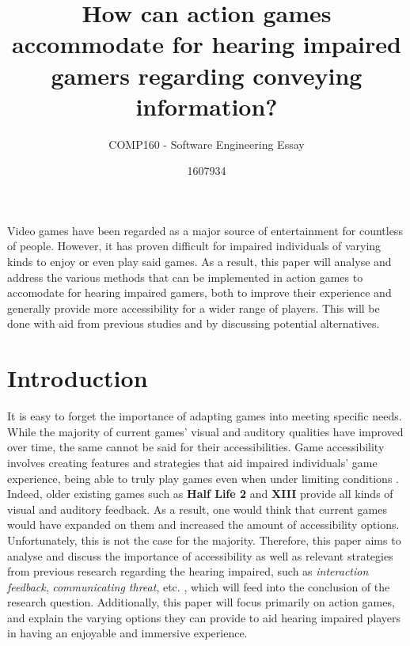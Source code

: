 \documentclass{scrartcl}
\title{How can action games accommodate for hearing impaired gamers regarding conveying information?}
\subtitle{COMP160 - Software Engineering Essay}
\author{1607934}
\begin{document}
\maketitle

\abstract
Video games have been regarded as a major source of entertainment for countless of people. However, it has proven difficult for impaired individuals of varying kinds to enjoy or even play said games. As a result, this paper will analyse and address the various methods that can be implemented in action games to accomodate for hearing impaired gamers, both to improve their experience and generally provide more accessibility for a wider range of players. This will be done with aid from previous studies and by discussing potential alternatives.

\section{Introduction}
It is easy to forget the importance of adapting games into meeting specific needs. While the majority of current games' visual and auditory qualities have improved over time, the same cannot be said for their accessibilities. Game accessibility involves creating features and strategies that aid impaired individuals' game experience, being able to truly play games even when under limiting conditions \cite{Bierre}. Indeed, older existing games such as \textbf{Half Life 2} \cite{Denise} and \textbf{XIII} provide all kinds of visual and auditory feedback. As a result, one would think that current games would have expanded on them and increased the amount of accessibility options. Unfortunately, this is not the case for the majority. Therefore, this paper aims to analyse and discuss the importance of accessibility as well as relevant strategies from previous research regarding the hearing impaired, such as \textit{interaction feedback}, \textit{communicating threat}, etc. \cite{Denise}, which will feed into the conclusion of the research question. Additionally, this paper will focus primarily on action games, and explain the varying options they can provide to aid hearing impaired players in having an enjoyable and immersive experience.
\end{document}
